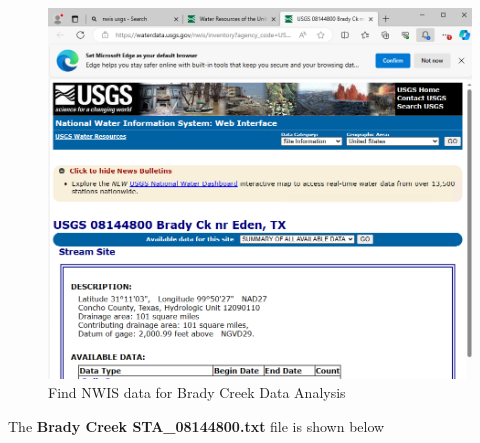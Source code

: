 \documentclass[12pt]{article}
\begin{document}
\begin{enumerate}
\begin{figure}[h!] %
   \centering
   \includegraphics[width=6in]{BradyCreek.png} 
   \caption{Find NWIS data for Brady Creek Data Analysis}
   \label{fig:BradyCreek}
\end{figure}

\clearpage

The \textbf{Brady Creek STA\_08144800.txt} file is shown below


\end{enumerate}
\end{document}
